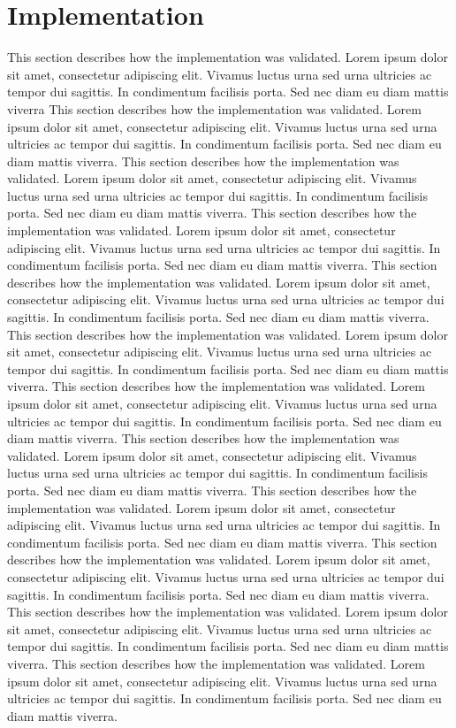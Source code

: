 \section{Implementation}
This section describes how the implementation was validated. 
Lorem ipsum dolor sit amet, consectetur adipiscing elit. Vivamus 
luctus urna sed urna ultricies ac tempor dui sagittis. In condimentum 
facilisis porta. Sed nec diam eu diam mattis viverra
This section describes how the implementation was validated. 
Lorem ipsum dolor sit amet, consectetur adipiscing elit. Vivamus 
luctus urna sed urna ultricies ac tempor dui sagittis. In condimentum 
facilisis porta. Sed nec diam eu diam mattis viverra.
This section describes how the implementation was validated. 
Lorem ipsum dolor sit amet, consectetur adipiscing elit. Vivamus 
luctus urna sed urna ultricies ac tempor dui sagittis. In condimentum 
facilisis porta. Sed nec diam eu diam mattis viverra.
This section describes how the implementation was validated. 
Lorem ipsum dolor sit amet, consectetur adipiscing elit. Vivamus 
luctus urna sed urna ultricies ac tempor dui sagittis. In condimentum 
facilisis porta. Sed nec diam eu diam mattis viverra.
This section describes how the implementation was validated. 
Lorem ipsum dolor sit amet, consectetur adipiscing elit. Vivamus 
luctus urna sed urna ultricies ac tempor dui sagittis. In condimentum 
facilisis porta. Sed nec diam eu diam mattis viverra.
This section describes how the implementation was validated. 
Lorem ipsum dolor sit amet, consectetur adipiscing elit. Vivamus 
luctus urna sed urna ultricies ac tempor dui sagittis. In condimentum 
facilisis porta. Sed nec diam eu diam mattis viverra.
This section describes how the implementation was validated. 
Lorem ipsum dolor sit amet, consectetur adipiscing elit. Vivamus 
luctus urna sed urna ultricies ac tempor dui sagittis. In condimentum 
facilisis porta. Sed nec diam eu diam mattis viverra.
This section describes how the implementation was validated. 
Lorem ipsum dolor sit amet, consectetur adipiscing elit. Vivamus 
luctus urna sed urna ultricies ac tempor dui sagittis. In condimentum 
facilisis porta. Sed nec diam eu diam mattis viverra.
This section describes how the implementation was validated. 
Lorem ipsum dolor sit amet, consectetur adipiscing elit. Vivamus 
luctus urna sed urna ultricies ac tempor dui sagittis. In condimentum 
facilisis porta. Sed nec diam eu diam mattis viverra.
This section describes how the implementation was validated. 
Lorem ipsum dolor sit amet, consectetur adipiscing elit. Vivamus 
luctus urna sed urna ultricies ac tempor dui sagittis. In condimentum 
facilisis porta. Sed nec diam eu diam mattis viverra.
This section describes how the implementation was validated. 
Lorem ipsum dolor sit amet, consectetur adipiscing elit. Vivamus 
luctus urna sed urna ultricies ac tempor dui sagittis. In condimentum 
facilisis porta. Sed nec diam eu diam mattis viverra.
This section describes how the implementation was validated. 
Lorem ipsum dolor sit amet, consectetur adipiscing elit. Vivamus 
luctus urna sed urna ultricies ac tempor dui sagittis. In condimentum 
facilisis porta. Sed nec diam eu diam mattis viverra.